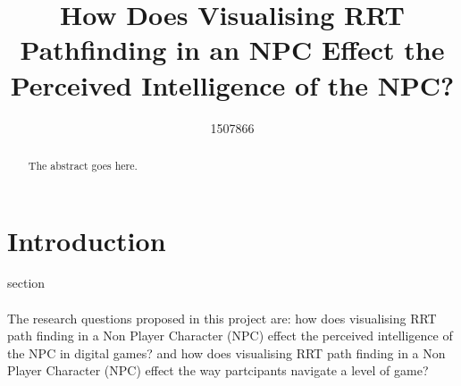 \documentclass[journal]{IEEEtran}
\begin{document}
%
\title{ How Does Visualising RRT Pathfinding in an NPC Effect the Perceived Intelligence of the NPC?}
%
%
\author{1507866}


\maketitle

\begin{abstract}
The abstract goes here.
\end{abstract}

\section{Introduction}
% 
% 
% 
% 
 section \\
\\
The research questions proposed in this project are: how does visualising RRT path finding in a Non Player Character (NPC) effect the perceived intelligence of the NPC in digital games? and how does visualising RRT path finding in a Non Player Character (NPC) effect the way partcipants navigate a level of game? 
\end{document}
